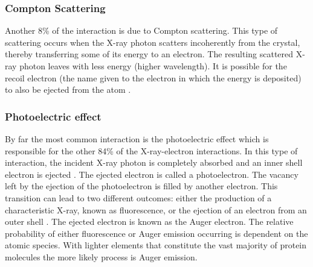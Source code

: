         \subsubsection{Compton Scattering}
        \label{subs:Compton Scattering}
            Another 8\% of the interaction is due to Compton scattering. This type of scattering occurs when the X-ray photon scatters incoherently from the crystal, thereby transferring some of its energy to an electron.
            The resulting scattered X-ray photon leaves with less energy (higher wavelength). It is possible for the recoil electron (the name given to the electron in which the energy is deposited) to also be ejected from the atom \cite{nave1995}.

        \subsubsection{Photoelectric effect}
        \label{subs:Photoelectric effect}
            By far the most common interaction is the photoelectric effect which is responsible for the other 84\% of the X-ray-electron interactions.
            In this type of interaction, the incident X-ray photon is completely absorbed and an inner shell electron is ejected \cite{garman2010}.
            The ejected electron is called a photoelectron. The vacancy left by the ejection of the photoelectron is filled by another electron.
            This transition can lead to two different outcomes: either the production of a characteristic X-ray, known as fluorescence, or the ejection of an electron from an outer shell \cite{nave1995}.
            The ejected electron is known as the Auger electron. The relative probability of either fluorescence or Auger emission occurring is dependent on the atomic species.
            With lighter elements that constitute the vast majority of protein molecules the more likely process is Auger emission.


